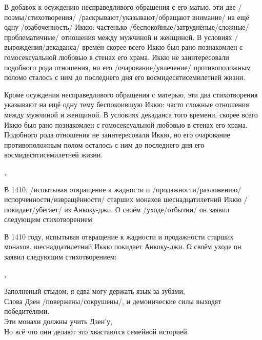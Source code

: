 \begin{ver}
В добавок к осуждению несправедливого обрашения с его матью, эти две
/поэмы/стихотворения/ /раскрывают/указывают/обращают внимание/ на ещё
одну /озабоченность/ Иккю: частенько
/беспокойные/затруднёные/сложные/проблематичные/ отношения между
мужчиной и женщиной. В условиях /вырождения/декаданса/ времён скорее
всего Иккю был рано познакомлен с гомосексуальной любовью в стенах его
храма. Иккю не заинтересовали подобного рода отношения, но его
/очарование/увлечение/ противоположным поломо сталось с ним до
последнего дня его восмидесятисемилетней жизни.
\end{ver}
\begin{ver}[1]
Кроме осуждения несправедливого обращения с матерью, эти два
стихотворения указывают на ещё одну тему беспокоившую Иккю: часто
сложные отношения между мужчиной и женщиной. В условиях декаданса того
времени, скорее всего Иккю был рано познакомлен с гомосексуальной
любовью в стенах его храма. Подобного рода отношения не заинтересовали
Иккю, но его очарование противоположным полом осталось с ним до
последнего дня его восмидесятисемилетней жизни.  
\end{ver}
\sep

\begin{ver}
В 1410, /испытывая отвращение к  жадности и
/продажности/разложению/испорченности/извращённости/
старших монахов шеснадцатилетний Иккю /покидает/убегает/ из
Анкоку-джи. О своём /уходе/отбытии/ он заявил следующим стихотворением
\end{ver}
\begin{ver}[1]
В 1410 году, испытывая отвращение к  жадности и
продажности 
старших монахов, шеснадцатилетний Иккю покидает 
Анкоку-джи. О своём уходе он заявил следующим стихотворением:
\end{ver}
\sep

\begin{ver}
\begin{verses}
  Заполненый стыдом, я едва могу держать язык за зубами,\\
  Слова Дзен /повержены/сокрушены/, и демонические силы выходят
  победителями.\\
  Эти монахи должны учить Дзен'у,\\
  Но всё что они делают это хвастаются семейной историей.
\end{verses}
\end{ver}
 
